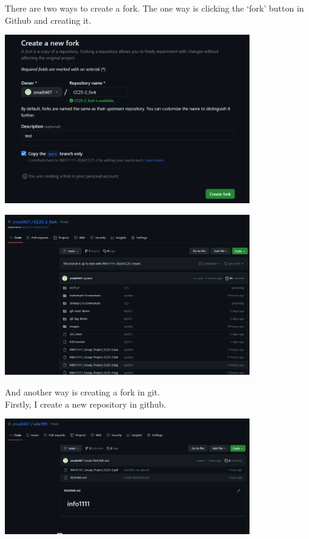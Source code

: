 \documentclass[a4paper, 11pt]{report}
\begin{document}
\noindent There are two ways to create a fork. The one way is clicking the ‘fork’ button in Github and creating it.
\begin{center}
	\includegraphics[width=0.8\textwidth, keepaspectratio]{createanewfork_ingithub}
\end{center}


\begin{center}
	\includegraphics[width=0.8\textwidth, keepaspectratio]{anewfork_ingithub}
\end{center}


\noindent And another way is creating a fork in git.\\
Firstly, I create a new repository in github.
\begin{center}
	\includegraphics[width=0.8\textwidth, keepaspectratio]{newrepository}
\end{center}
\end{document}
